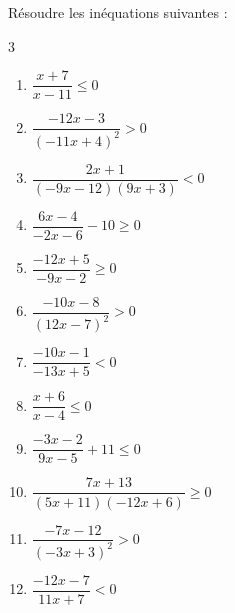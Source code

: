 {%
\begin{Exercice}%
Résoudre les inéquations suivantes :
\begin{multicols}{3}
\begin{enumerate}[itemsep=2em]
	\item \begin{minipage}[t]{\linewidth}$\dfrac{x+7}{x-11} \leqslant 0$\end{minipage}
	\item \begin{minipage}[t]{\linewidth}$\dfrac{-12x-3}{(-11x+4)^2} > 0$\end{minipage}
	\item \begin{minipage}[t]{\linewidth}$\dfrac{2x+1}{(-9x-12)(9x+3)} < 0$\end{minipage}
	\item \begin{minipage}[t]{\linewidth}$\dfrac{6x-4}{-2x-6}-10 \geqslant 0$\end{minipage}
	\item \begin{minipage}[t]{\linewidth}$\dfrac{-12x+5}{-9x-2} \geqslant 0$\end{minipage}
	\item \begin{minipage}[t]{\linewidth}$\dfrac{-10x-8}{(12x-7)^2} > 0$\end{minipage}
	\item \begin{minipage}[t]{\linewidth}$\dfrac{-10x-1}{-13x+5} < 0$\end{minipage}
	\item \begin{minipage}[t]{\linewidth}$\dfrac{x+6}{x-4} \leqslant 0$\end{minipage}
	\item \begin{minipage}[t]{\linewidth}$\dfrac{-3x-2}{9x-5}+11 \leqslant 0$\end{minipage}
	\item \begin{minipage}[t]{\linewidth}$\dfrac{7x+13}{(5x+11)(-12x+6)} \geqslant 0$\end{minipage}
	\item \begin{minipage}[t]{\linewidth}$\dfrac{-7x-12}{(-3x+3)^2} > 0$\end{minipage}
	\item \begin{minipage}[t]{\linewidth}$\dfrac{-12x-7}{11x+7} < 0$\end{minipage}
\end{enumerate}
\end{multicols}
\end{Exercice}

}
